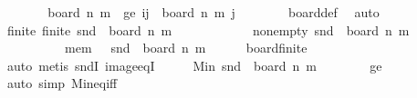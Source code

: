 \begin{isabellebody}
\ \ \isamarkupfalse%
\ \isamarkupfalse%
\ {\isachardoublequoteopen}{\isacharparenleft}{\kern0pt}{}{\isacharcomma}{\kern0pt}{}{\isacharparenright}{\kern0pt}\ {\isasymin}\ board\ n\ m{\isachardoublequoteclose}\ \ ge{\isacharunderscore}{\kern0pt}{}{\isacharcolon}{\kern0pt}\ {\isachardoublequoteopen}{\isasymforall}{\isacharparenleft}{\kern0pt}i{\isacharcomma}{\kern0pt}j{\isacharparenright}{\kern0pt}\ {\isasymin}\ board\ n\ m{\isachardot}{\kern0pt}\ j\ {\isasymge}\ {}{\isachardoublequoteclose}\isanewline
\ \ \ \ \isamarkupfalse%
\ board{\isacharunderscore}{\kern0pt}def\ \isamarkupfalse%
\ auto\isanewline
\ \ \isamarkupfalse%
\ \isamarkupfalse%
\ finite{\isacharcolon}{\kern0pt}\ {\isachardoublequoteopen}finite\ {\isacharparenleft}{\kern0pt}{\isacharparenleft}{\kern0pt}snd{\isacharparenright}{\kern0pt}\ {\isacharbackquote}{\kern0pt}\ board\ n\ m{\isacharparenright}{\kern0pt}{\isachardoublequoteclose}\ \ \isanewline
\ \ \ \ \ \ \ \ \ \ non{\isacharunderscore}{\kern0pt}empty{\isacharcolon}{\kern0pt}\ {\isachardoublequoteopen}{\isacharparenleft}{\kern0pt}snd{\isacharparenright}{\kern0pt}\ {\isacharbackquote}{\kern0pt}\ board\ n\ m\ {\isasymnoteq}\ {\isacharbraceleft}{\kern0pt}{\isacharbraceright}{\kern0pt}{\isachardoublequoteclose}\ \isanewline
\ \ \ \ \ \ \ \ \ \ mem{\isacharunderscore}{\kern0pt}{}{\isacharcolon}{\kern0pt}\ {\isachardoublequoteopen}{}\ {\isasymin}\ {\isacharparenleft}{\kern0pt}snd{\isacharparenright}{\kern0pt}\ {\isacharbackquote}{\kern0pt}\ board\ n\ m{\isachardoublequoteclose}\isanewline
\ \ \ \ \isamarkupfalse%
\ board{\isacharunderscore}{\kern0pt}finite\ \isamarkupfalse%
\ auto\ {\isacharparenleft}{\kern0pt}metis\ sndI\ image{\isacharunderscore}{\kern0pt}eqI{\isacharparenright}{\kern0pt}\isanewline
\ \ \isamarkupfalse%
\ \isamarkupfalse%
\ {\isachardoublequoteopen}Min\ {\isacharparenleft}{\kern0pt}{\isacharparenleft}{\kern0pt}snd{\isacharparenright}{\kern0pt}\ {\isacharbackquote}{\kern0pt}\ board\ n\ m{\isacharparenright}{\kern0pt}\ {\isacharequal}{\kern0pt}\ {}{\isachardoublequoteclose}\isanewline
\ \ \ \ \isamarkupfalse%
\ ge{\isacharunderscore}{\kern0pt}{}\ \isamarkupfalse%
\ {\isacharparenleft}{\kern0pt}auto\ simp{\isacharcolon}{\kern0pt}\ Min{\isacharunderscore}{\kern0pt}eq{\isacharunderscore}{\kern0pt}iff{\isacharparenright}{\kern0pt}\isanewline

\end{isabellebody}
